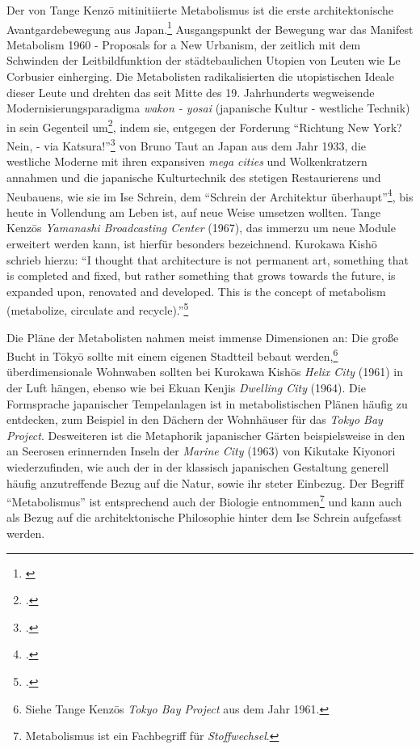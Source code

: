\documentclass[a4paper, 12pt]{article}
\begin{document}
\begin{onehalfspace}
Der von Tange Kenzō mitinitiierte Metabolismus ist die erste architektonische Avantgardebewegung aus Japan.\footnote{\Cite[Vgl.][S. 243]{gleiter}} Ausgangspunkt der Bewegung war das Manifest Metabolism 1960 - Proposals for a New Urbanism, der zeitlich mit dem Schwinden der Leitbildfunktion der städtebaulichen Utopien von Leuten wie Le Corbusier einherging. Die Metabolisten radikalisierten die utopistischen Ideale dieser Leute und drehten das seit Mitte des 19. Jahrhunderts wegweisende Modernisierungsparadigma \emph{wakon - yosai} (japanische Kultur - westliche Technik) in sein Gegenteil um\footnote{\Cite[Vgl.][S. 243]{gleiter}.}, indem sie, entgegen der Forderung "`Richtung New York? Nein, - via Katsura!"'\footnote{\Cite[Vgl.][S. 2]{taut}.} von Bruno Taut an Japan aus dem Jahr 1933, die westliche Moderne mit ihren expansiven \emph{mega cities} und Wolkenkratzern annahmen und die japanische Kulturtechnik des stetigen Restaurierens und Neubauens, wie sie im Ise Schrein, dem "`Schrein der Architektur überhaupt"'\footnote{\Cite[Siehe][S. 19]{taut}.}, bis heute in Vollendung am Leben ist, auf neue Weise umsetzen wollten. Tange Kenzōs \emph{Yamanashi Broadcasting Center} (1967), das immerzu um neue Module erweitert werden kann, ist hierfür besonders bezeichnend. Kurokawa Kishō schrieb hierzu: "`I thought that architecture is not permanent art, something that is completed and fixed, but rather something that grows towards the future, is expanded upon, renovated and developed. This is the concept of metabolism (metabolize, circulate and recycle)."'\footnote{\Cite[Siehe][S. 6]{agekuro}.} 

Die Pläne der Metabolisten nahmen meist immense Dimensionen an: Die große Bucht in Tōkyō sollte mit einem eigenen Stadtteil bebaut werden,\footnote{Siehe Tange Kenzōs \emph{Tokyo Bay Project} aus dem Jahr 1961.} überdimensionale Wohnwaben sollten bei Kurokawa Kishōs \emph{Helix City} (1961) in der Luft hängen, ebenso wie bei Ekuan Kenjis \emph{Dwelling City} (1964). Die Formsprache japanischer Tempelanlagen ist in metabolistischen Plänen häufig zu entdecken, zum Beispiel in den Dächern der Wohnhäuser für das \emph{Tokyo Bay Project}. Desweiteren ist die Metaphorik japanischer Gärten beispielsweise in den an Seerosen erinnernden Inseln der \emph{Marine City} (1963) von Kikutake Kiyonori wiederzufinden, wie auch der in der klassisch japanischen Gestaltung generell häufig anzutreffende Bezug auf die Natur, sowie ihr steter Einbezug. Der Begriff "`Metabolismus"' ist entsprechend auch der Biologie entnommen\footnote{Metabolismus ist ein Fachbegriff für \emph{Stoffwechsel}.} und kann auch als Bezug auf die architektonische Philosophie hinter dem Ise Schrein aufgefasst werden. 


\end{onehalfspace}
\end{document}
